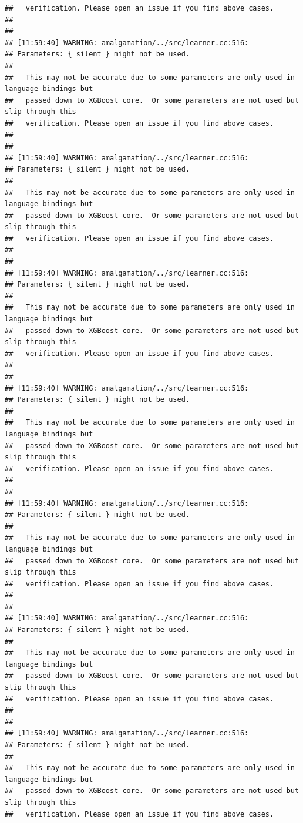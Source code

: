 \documentclass[AMS,STIX2COL]{WileyNJD-v2}\usepackage[]{graphicx}\usepackage[]{color}
\makeatletter
\newenvironment{kframe}{%
 \def\at@end@of@kframe{}%
 \ifinner\ifhmode%
  \def\at@end@of@kframe{\end{minipage}}%
  \begin{minipage}{\columnwidth}%
 \fi\fi%
 \def\FrameCommand##1{\hskip\@totalleftmargin \hskip-\fboxsep
 \colorbox{shadecolor}{##1}\hskip-\fboxsep
     \hskip-\linewidth \hskip-\@totalleftmargin \hskip\columnwidth}%
 \MakeFramed {\advance\hsize-\width
   \@totalleftmargin\z@ \linewidth\hsize
   \@setminipage}}%
 {\par\unskip\endMakeFramed%
 \at@end@of@kframe}
\newenvironment{knitrout}{}{} %
\makeatother
\begin{document}
\begin{knitrout}
\begin{kframe}
\begin{verbatim}
##   verification. Please open an issue if you find above cases.
## 
## 
## [11:59:40] WARNING: amalgamation/../src/learner.cc:516: 
## Parameters: { silent } might not be used.
## 
##   This may not be accurate due to some parameters are only used in language bindings but
##   passed down to XGBoost core.  Or some parameters are not used but slip through this
##   verification. Please open an issue if you find above cases.
## 
## 
## [11:59:40] WARNING: amalgamation/../src/learner.cc:516: 
## Parameters: { silent } might not be used.
## 
##   This may not be accurate due to some parameters are only used in language bindings but
##   passed down to XGBoost core.  Or some parameters are not used but slip through this
##   verification. Please open an issue if you find above cases.
## 
## 
## [11:59:40] WARNING: amalgamation/../src/learner.cc:516: 
## Parameters: { silent } might not be used.
## 
##   This may not be accurate due to some parameters are only used in language bindings but
##   passed down to XGBoost core.  Or some parameters are not used but slip through this
##   verification. Please open an issue if you find above cases.
## 
## 
## [11:59:40] WARNING: amalgamation/../src/learner.cc:516: 
## Parameters: { silent } might not be used.
## 
##   This may not be accurate due to some parameters are only used in language bindings but
##   passed down to XGBoost core.  Or some parameters are not used but slip through this
##   verification. Please open an issue if you find above cases.
## 
## 
## [11:59:40] WARNING: amalgamation/../src/learner.cc:516: 
## Parameters: { silent } might not be used.
## 
##   This may not be accurate due to some parameters are only used in language bindings but
##   passed down to XGBoost core.  Or some parameters are not used but slip through this
##   verification. Please open an issue if you find above cases.
## 
## 
## [11:59:40] WARNING: amalgamation/../src/learner.cc:516: 
## Parameters: { silent } might not be used.
## 
##   This may not be accurate due to some parameters are only used in language bindings but
##   passed down to XGBoost core.  Or some parameters are not used but slip through this
##   verification. Please open an issue if you find above cases.
## 
## 
## [11:59:40] WARNING: amalgamation/../src/learner.cc:516: 
## Parameters: { silent } might not be used.
## 
##   This may not be accurate due to some parameters are only used in language bindings but
##   passed down to XGBoost core.  Or some parameters are not used but slip through this
##   verification. Please open an issue if you find above cases.

\end{verbatim}
\end{kframe}
\end{knitrout}
\end{document}
